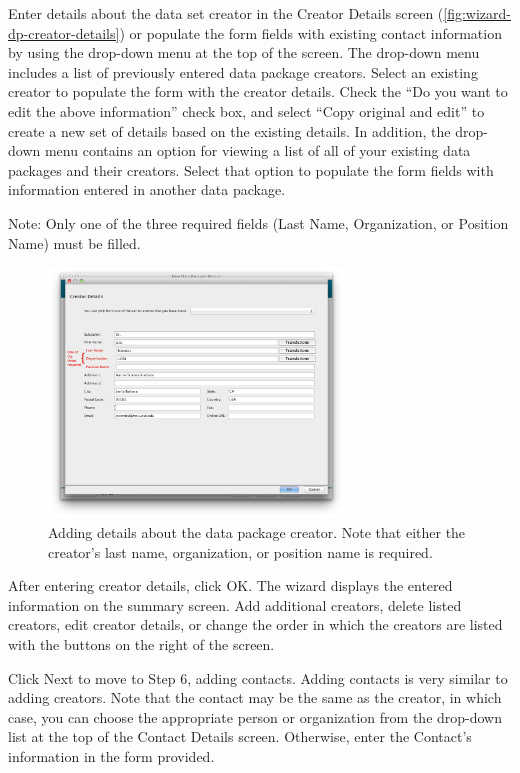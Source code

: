 Enter details about the data set creator in the Creator Details screen
(\autoref{fig:wizard-dp-creator-details}) or populate the form fields with
existing contact information by using the drop-down menu at the top of
the screen. The drop-down menu includes a list of previously entered
data package creators. Select an existing creator to populate the form with
the creator details. Check the ``Do you want to edit the above
information'' check box, and select ``Copy original and edit'' to create
a new set of details based on the existing details. In addition, the
drop-down menu contains an option for viewing a list of all of your
existing data packages and their creators. Select that option to populate
the form fields with information entered in another data package. 

Note: Only one of the three required fields (Last Name, Organization, or
Position Name) must be filled. 

\begin{figure}
  \centering
    \includegraphics[width=0.7\textwidth]{images/wizard-dp-creator-details.png}
  \caption{Adding details about the data package creator. Note that either
    the creator's last name, organization, or position name is required.}
  \label{fig:wizard-dp-creator-details}
\end{figure}

After entering creator details, click OK. The wizard displays the entered
information on the summary screen. Add additional creators, delete listed
creators, edit creator details, or change the order in which the creators are
listed with the buttons on the right of the screen. 

Click Next to move to Step 6, adding contacts. Adding contacts is very
similar to adding creators. Note that the contact may be the same as the
creator, in which case, you can choose the appropriate person or
organization from the drop-down list at the top of the Contact Details
screen. Otherwise, enter the Contact's information in the form provided.

